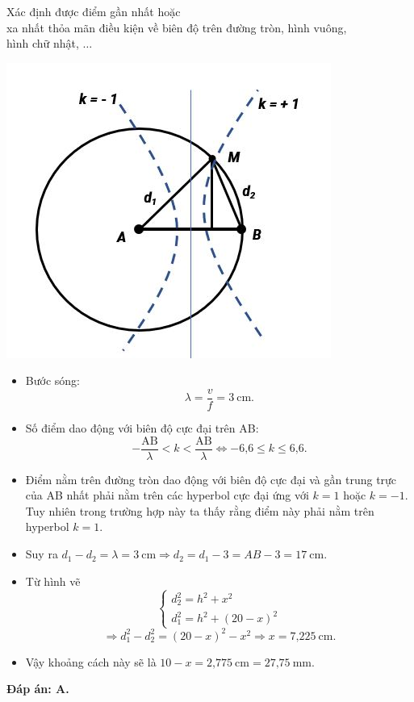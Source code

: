 \begin{dang}{Xác định được điểm gần nhất hoặc\\ xa nhất thỏa mãn điều kiện về biên độ trên đường tròn, hình vuông,\\ hình chữ nhật, $\ldots$}
{\begin{center}
			\vspace*{1em}
			\includegraphics[scale=0.8]{../figs/VN12-PH-11-A-007-4-V2-5.JPG}
		\end{center}
		\begin{itemize}
			\item Bước sóng:
			\begin{equation*}
				\lambda = \dfrac{v}{f} = 3\ \text{cm}.
			\end{equation*}
			\item Số điểm dao động với biên độ cực đại trên AB:
			\begin{equation*}
				-\dfrac{\text{AB}}{\lambda} < k < \dfrac{\text{AB}}{\lambda} \Leftrightarrow -\text{6,6} \leq k \leq \text{6,6}.
			\end{equation*}
			\item Điểm nằm trên đường tròn dao động với biên độ cực đại và gần trung trực của AB nhất phải nằm trên các hyperbol cực đại ứng với $k = 1$ hoặc $k = -1$. Tuy nhiên trong trường hợp này ta thấy rằng điểm này phải nằm trên hyperbol $k = 1$.
			\item Suy ra $d_1 -d_2 =\lambda =3\ \text{cm} \Rightarrow d_2=d_1 - 3 =AB-3 =17\ \text{cm}$.
			\item Từ hình vẽ
			\begin{equation*}
				\begin{cases}
					d^2_2=h^2+x^2\\
					d^2_1=h^2 + (20-x)^2
				\end{cases}
			\end{equation*}
			\begin{equation*}
				\Rightarrow d_1^2-d_2^2 =(20-x)^2-x^2 \Rightarrow x =\text{7,225}\ \text{cm}.
			\end{equation*}
			\item Vậy khoảng cách này sẽ là $10-x=\text{2,775}\ \text{cm} =\text{27,75}\ \text{mm}$.
		\end{itemize}
		
		\textbf{Đáp án: A.}
	}
\end{dang}